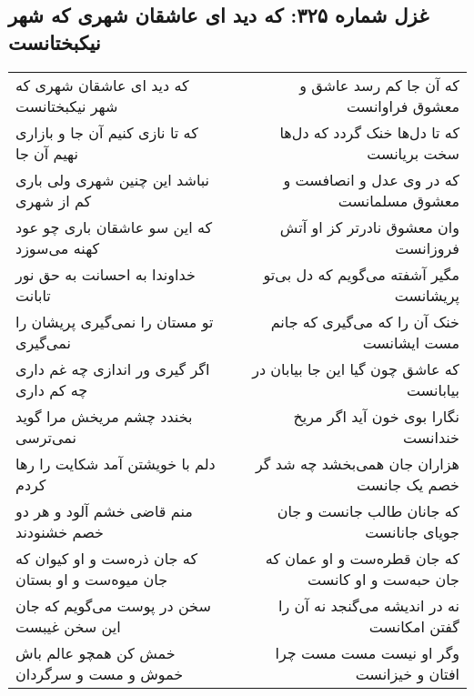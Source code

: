 \begin{center}
\section*{غزل شماره ۳۲۵: که دید ای عاشقان شهری که شهر نیکبختانست}
\label{sec:0325}
\begin{longtable}{l p{0.5cm} r}
که دید ای عاشقان شهری که شهر نیکبختانست
&&
که آن جا کم رسد عاشق و معشوق فراوانست
\\
که تا نازی کنیم آن جا و بازاری نهیم آن جا
&&
که تا دل‌ها خنک گردد که دل‌ها سخت بریانست
\\
نباشد این چنین شهری ولی باری کم از شهری
&&
که در وی عدل و انصافست و معشوق مسلمانست
\\
که این سو عاشقان باری چو عود کهنه می‌سوزد
&&
وان معشوق نادرتر کز او آتش فروزانست
\\
خداوندا به احسانت به حق نور تابانت
&&
مگیر آشفته می‌گویم که دل بی‌تو پریشانست
\\
تو مستان را نمی‌گیری پریشان را نمی‌گیری
&&
خنک آن را که می‌گیری که جانم مست ایشانست
\\
اگر گیری ور اندازی چه غم داری چه کم داری
&&
که عاشق چون گیا این جا بیابان در بیابانست
\\
بخندد چشم مریخش مرا گوید نمی‌ترسی
&&
نگارا بوی خون آید اگر مریخ خندانست
\\
دلم با خویشتن آمد شکایت را رها کردم
&&
هزاران جان همی‌بخشد چه شد گر خصم یک جانست
\\
منم قاضی خشم آلود و هر دو خصم خشنودند
&&
که جانان طالب جانست و جان جویای جانانست
\\
که جان ذره‌ست و او کیوان که جان میوه‌ست و او بستان
&&
که جان قطره‌ست و او عمان که جان حبه‌ست و او کانست
\\
سخن در پوست می‌گویم که جان این سخن غیبست
&&
نه در اندیشه می‌گنجد نه آن را گفتن امکانست
\\
خمش کن همچو عالم باش خموش و مست و سرگردان
&&
وگر او نیست مست مست چرا افتان و خیزانست
\\
\end{longtable}
\end{center}
